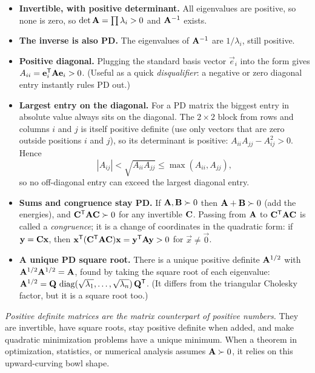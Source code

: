 \begin{itemize}
  \item \textbf{Invertible, with positive determinant.} All eigenvalues are positive, so none is
  zero, so $\det\mathbf{A} = \prod\lambda_i > 0$ and $\mathbf{A}^{-1}$ exists.
  \item \textbf{The inverse is also PD.} The eigenvalues of $\mathbf{A}^{-1}$ are $1/\lambda_i$, still
  positive.
  \item \textbf{Positive diagonal.} Plugging the standard basis vector $\vec{e}_i$ into the form
  gives $A_{ii} = \mathbf{e}_i^{\mathsf{T}}\mathbf{A}\mathbf{e}_i > 0$. (Useful as a quick \emph{disqualifier}: a
  negative or zero diagonal entry instantly rules PD out.)
  \item \textbf{Largest entry on the diagonal.} For a PD matrix the biggest entry in absolute value
  always sits on the diagonal. The $2\times 2$ block from rows and columns $i$ and $j$ is itself
  positive definite (use only vectors that are zero outside positions $i$ and $j$), so its
  determinant is positive: $A_{ii} A_{jj} - A_{ij}^2 > 0$. Hence
  \[
    |A_{ij}| < \sqrt{A_{ii} A_{jj}} \leq \max(A_{ii}, A_{jj}),
  \]
  so no off-diagonal entry can exceed the largest diagonal entry.
  \item \textbf{Sums and congruence stay PD.} If $\mathbf{A},\mathbf{B}\succ0$ then $\mathbf{A}+\mathbf{B}\succ0$
  (add the energies), and $\mathbf{C}^{\mathsf{T}}\mathbf{A}\mathbf{C}\succ0$ for any invertible $\mathbf{C}$. Passing from
  $\mathbf{A}$ to $\mathbf{C}^{\mathsf{T}}\mathbf{A}\mathbf{C}$ is called a \emph{congruence}; it is a change of coordinates
  in the quadratic form: if $\mathbf{y} = \mathbf{C}\mathbf{x}$, then
  $\mathbf{x}^{\mathsf{T}}(\mathbf{C}^{\mathsf{T}}\mathbf{A}\mathbf{C})\mathbf{x} = \mathbf{y}^{\mathsf{T}}\mathbf{A}\mathbf{y} > 0$ for $\vec{x}\neq\vec{0}$.
  \item \textbf{A unique PD square root.} There is a unique positive definite $\mathbf{A}^{1/2}$ with
  $\mathbf{A}^{1/2}\mathbf{A}^{1/2}=\mathbf{A}$, found by taking the square root of each eigenvalue:
  $\mathbf{A}^{1/2}=\mathbf{Q}\,\operatorname{diag}(\sqrt{\lambda_1},\dots,\sqrt{\lambda_n})\,\mathbf{Q}^{\mathsf{T}}$. (It differs
  from the triangular Cholesky factor, but it is a square root too.)
\end{itemize}

\begin{focusbox}
\emph{Positive definite matrices are the matrix counterpart of positive numbers.} They are
invertible, have square roots, stay positive definite when added, and make quadratic minimization
problems have a unique minimum. When a theorem in optimization, statistics, or numerical analysis
assumes $\mathbf{A}\succ0$, it relies on this upward-curving bowl shape.
\end{focusbox}

